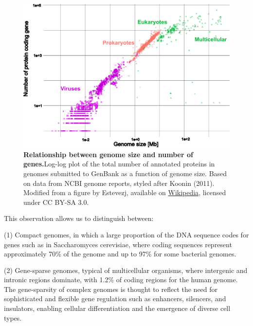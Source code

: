 \documentclass[11pt]{book}
\begin{document}
\begin{figure}[htbp]
    \centering
    \includegraphics[width=\textwidth]{Figures/Introduction/Genome_size_vs_number_of_genes.pdf}
    \caption{\textbf{Relationship between genome size and number of genes.}Log-log plot of the total number of annotated proteins in genomes submitted to GenBank as a function of genome size. Based on data from NCBI genome reports, styled after Koonin (2011). Modified from a figure by Estevezj, available on \href{https://en.wikipedia.org/wiki/File:Genome_size_vs_number_of_genes.svg}{Wikipedia}, licensed under CC BY-SA 3.0.}
    \label{fig:genomesize}
\end{figure}

This observation allows us to distinguish between:

(1) Compact genomes, in which a large proportion of the DNA sequence codes for genes such as in Saccharomyces cerevisiae, where coding sequences represent approximately 70\% of the genome\cite{alexanderAnnotatingNoncodingRegions2010a} and up to 97\% for some bacterial genomes\cite{landInsights20Years2015}.

(2) Gene-sparse genomes, typical of multicellular organisms, where intergenic and intronic regions dominate, with 1.2\% of coding regions for the human genome\cite{omennReflectionsHUPOHuman2021}.\\
The gene-sparsity of complex genomes is thought to reflect the need for sophisticated and flexible gene regulation such as enhancers, silencers, and insulators, enabling cellular differentiation and the emergence of diverse cell types\cite{sebe-pedrosEarlyMetazoanCell2018}.
\end{document}
